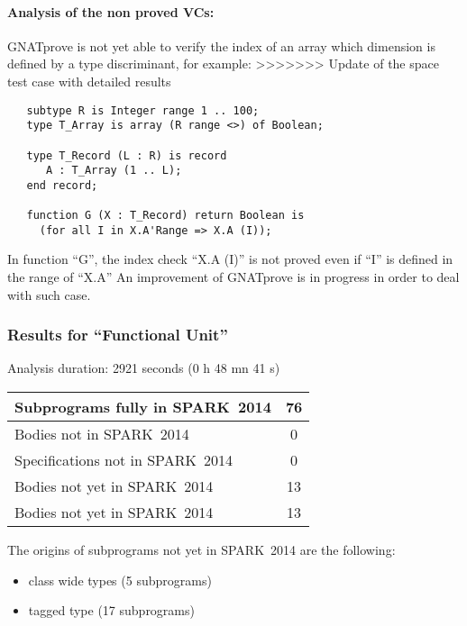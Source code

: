 \documentclass[10pt,a4paper,twocolumn]{article}
\newcommand{\gnatprove}{GNATprove\xspace}
\newcommand{\newspark}{SPARK~2014\xspace}
\begin{document}

\paragraph{Analysis of the non proved VCs:}
\gnatprove is not yet able to verify the index of an array which dimension is defined by a type discriminant, for example:
>>>>>>> Update of the space test case with detailed results

\begin{lstlisting}
   subtype R is Integer range 1 .. 100;
   type T_Array is array (R range <>) of Boolean;

   type T_Record (L : R) is record
      A : T_Array (1 .. L);
   end record;

   function G (X : T_Record) return Boolean is
     (for all I in X.A'Range => X.A (I));
\end{lstlisting}

In function ``G'', the index check ``X.A (I)'' is not proved even if ``I'' is defined in the range of ``X.A''
An improvement of \gnatprove is in progress in order to deal with such case.

\subsubsection{Results for ``Functional Unit''}

Analysis duration: 2921 seconds (0 h 48 mn 41 s)

\vspace{5mm}

\begin{tabular}{|l|c|}
\hline
Subprograms fully in \newspark  &   76 \\
\hline
Bodies not in \newspark         &    0 \\
\hline
Specifications not in \newspark &    0 \\
\hline
Bodies not yet in \newspark     &   13 \\
\hline
Bodies not yet in \newspark     &   13 \\
\hline
\end{tabular}

\vspace{5mm}

The origins of subprograms not yet in \newspark are the following:

\begin{itemize}
\item class wide types (5 subprograms)
\item tagged type (17 subprograms)
\end{itemize}
\end{document}
